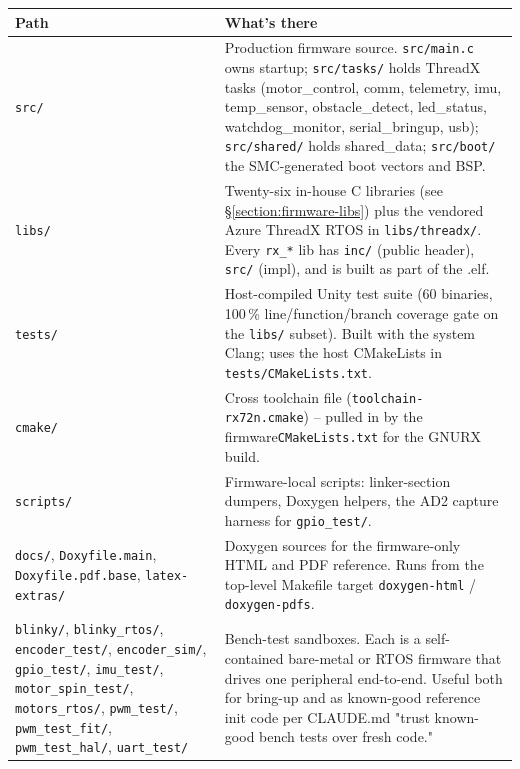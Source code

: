 \begin{center}
\begin{tabular}{|p{3.5cm}|p{10.5cm}|}
\hline
\textbf{Path}                & \textbf{What's there}                                                                                                                                                                                                          \\
\hline
\texttt{src/}                & Production firmware source. \texttt{src/main.c} owns startup; \texttt{src/tasks/} holds ThreadX tasks (motor\_control, comm, telemetry, imu, temp\_sensor, obstacle\_detect, led\_status, watchdog\_monitor, serial\_bringup, usb); \texttt{src/shared/} holds shared\_data; \texttt{src/boot/} the SMC-generated boot vectors and BSP. \\
\texttt{libs/}               & Twenty-six in-house C libraries (see \S\ref{section:firmware-libs}) plus the vendored Azure ThreadX RTOS in \texttt{libs/threadx/}. Every \texttt{rx\_*} lib has \texttt{inc/} (public header), \texttt{src/} (impl), and is built as part of the .elf. \\
\texttt{tests/}              & Host-compiled Unity test suite (60 binaries, 100\,\% line/function/branch coverage gate on the \texttt{libs/} subset). Built with the system Clang; uses the host CMakeLists in \texttt{tests/CMakeLists.txt}. \\
\texttt{cmake/}              & Cross toolchain file (\texttt{toolchain-rx72n.cmake}) -- pulled in by the firmware\texttt{CMakeLists.txt} for the GNURX build.                                                                                                  \\
\texttt{scripts/}            & Firmware-local scripts: linker-section dumpers, Doxygen helpers, the AD2 capture harness for \texttt{gpio\_test/}.                                                                                                              \\
\texttt{docs/}, \texttt{Doxyfile.main}, \texttt{Doxyfile.pdf.base}, \texttt{latex-extras/}            & Doxygen sources for the firmware-only HTML and PDF reference. Runs from the top-level Makefile target \texttt{doxygen-html} / \texttt{doxygen-pdfs}.                                                                            \\
\texttt{blinky/}, \texttt{blinky\_rtos/}, \texttt{encoder\_test/}, \texttt{encoder\_sim/}, \texttt{gpio\_test/}, \texttt{imu\_test/}, \texttt{motor\_spin\_test/}, \texttt{motors\_rtos/}, \texttt{pwm\_test/}, \texttt{pwm\_test\_fit/}, \texttt{pwm\_test\_hal/}, \texttt{uart\_test/}             & Bench-test sandboxes. Each is a self-contained bare-metal or RTOS firmware that drives one peripheral end-to-end. Useful both for bring-up and as known-good reference init code per CLAUDE.md "trust known-good bench tests over fresh code." \\

\end{tabular}
\end{center}
